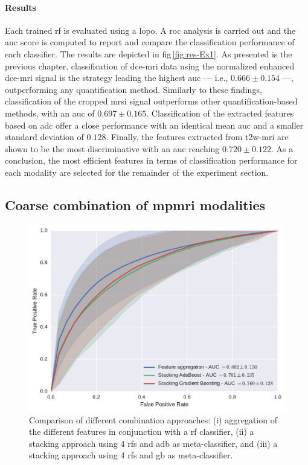 \paragraph{Results}
Each trained \ac{rf} is evaluated using a \ac{lopo}.
A \ac{roc} analysis is carried out and the \ac{auc} score is computed to report and compare the classification performance of each classifier.
The results are depicted in \acs{fig}\,\ref{fig:res-Ex1}.
As presented is the previous chapter, classification of \ac{dce}-\ac{mri} data using the normalized enhanced \ac{dce}-\ac{mri} signal is the strategy leading the highest \ac{auc} --- i.e., $0.666 \pm 0.154$ ---, outperforming any quantification method.
Similarly to these findings, classification of the cropped \ac{mrsi} signal outperforms other quantification-based methods, with an \ac{auc} of $0.697 \pm 0.165$.
Classification of the extracted features based on \ac{adc} offer a close performance with an identical mean \ac{auc} and a smaller standard deviation of $0.128$.
Finally, the features extracted from \ac{t2w}-\ac{mri} are shown to be the most discriminative with an \ac{auc} reaching $0.720 \pm 0.122$.
As a conclusion, the most efficient features in terms of classification performance for each modality are selected for the remainder of the experiment section.

\subsection{Coarse combination of \acs*{mpmri} modalities} \label{subsec:chp6:exp-res:Ex2}

\begin{figure}
  \centering
  \includegraphics[width=0.7\linewidth]{content/figures/exp-2/comb_all.pdf}
  \caption[Comparison of different combination approaches.]{Comparison of different combination approaches: (i) aggregation of the different features in conjunction with a \acs*{rf} classifier, (ii) a stacking approach using 4 \acs*{rf}s and \acs*{adb} as meta-classifier, and (iii) a stacking approach using 4 \acs*{rf}s and \acs*{gb} as meta-classifier.}
  \label{fig:res-Exp2}
\end{figure}

